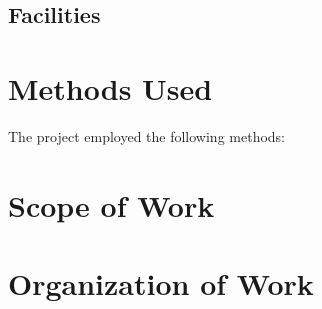\subsection{Facilities}

\section{Methods Used}

The project employed the following methods:

\section{Scope of Work}



\section{Organization of Work}


